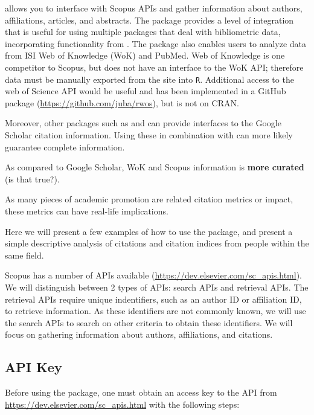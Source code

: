  allows you to interface with Scopus APIs and gather
information about authors, affiliations, articles, and abstracts. The
 package provides a level of integration that is
useful for using multiple packages that deal with bibliometric data,
incorporating functionality from . The 
package also enables users to analyze data from ISI Web of Knowledge
(WoK) and PubMed. Web of Knowledge is one competitor to Scopus, but
 does not have an interface to the WoK API; therefore
data must be manually exported from the site into \texttt{R}. Additional
access to the web of Science API would be useful and has been
implemented in a GitHub package 
(\url{https://github.com/juba/rwos}), but is not on CRAN.

Moreover, other packages such as  and  can
provide interfaces to the Google Scholar citation information. Using
these in combination with  can more likely guarantee
complete information.

As compared to Google Scholar, WoK and Scopus information is
\textbf{more curated} (is that true?).

As many pieces of academic promotion are related citation metrics or
impact, these metrics can have real-life implications.

Here we will present a few examples of how to use the 
package, and present a simple descriptive analysis of citations and
citation indices from people within the same field.

Scopus has a number of APIs available
(\url{https://dev.elsevier.com/sc_apis.html}). We will distinguish
between 2 types of APIs: search APIs and retrieval APIs. The retrieval
APIs require unique indentifiers, such as an author ID or affiliation
ID, to retrieve information. As these identifiers are not commonly
known, we will use the search APIs to search on other criteria to obtain
these identifiers. We will focus on gathering information about authors,
affiliations, and citations.

\hypertarget{api-key}{%
\subsection{API Key}\label{api-key}}

Before using the package, one must obtain an access key to the API from
\url{https://dev.elsevier.com/sc_apis.html} with the following steps:

